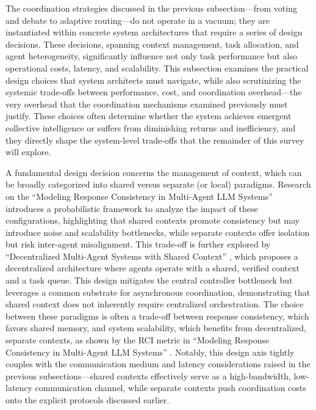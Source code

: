 \documentclass[11pt]{article}
\begin{document}
The coordination strategies discussed in the previous subsection---from voting and debate to adaptive routing---do not operate in a vacuum; they are instantiated within concrete system architectures that require a series of design decisions. These decisions, spanning context management, task allocation, and agent heterogeneity, significantly influence not only task performance but also operational costs, latency, and scalability. This subsection examines the practical design choices that system architects must navigate, while also scrutinizing the systemic trade-offs between performance, cost, and coordination overhead---the very overhead that the coordination mechanisms examined previously must justify. These choices often determine whether the system achieves emergent collective intelligence or suffers from diminishing returns and inefficiency, and they directly shape the system-level trade-offs that the remainder of this survey will explore.

A fundamental design decision concerns the management of context, which can be broadly categorized into shared versus separate (or local) paradigms. Research on the ``Modeling Response Consistency in Multi-Agent LLM Systems'' \cite{ref99} introduces a probabilistic framework to analyze the impact of these configurations, highlighting that shared contexts promote consistency but may introduce noise and scalability bottlenecks, while separate contexts offer isolation but risk inter-agent misalignment. This trade-off is further explored by ``Decentralized Multi-Agent Systems with Shared Context'' \cite{ref100}, which proposes a decentralized architecture where agents operate with a shared, verified context and a task queue. This design mitigates the central controller bottleneck but leverages a common substrate for asynchronous coordination, demonstrating that shared context does not inherently require centralized orchestration. The choice between these paradigms is often a trade-off between response consistency, which favors shared memory, and system scalability, which benefits from decentralized, separate contexts, as shown by the RCI metric in ``Modeling Response Consistency in Multi-Agent LLM Systems'' \cite{ref99}. Notably, this design axis tightly couples with the communication medium and latency considerations raised in the previous subsections---shared contexts effectively serve as a high-bandwidth, low-latency communication channel, while separate contexts push coordination costs onto the explicit protocols discussed earlier.
\end{document}

